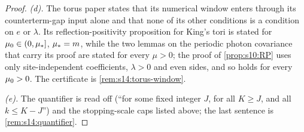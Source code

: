 \begin{proof}
\emph{(d).} The torus paper states that its numerical window enters through its counterterm-gap input alone and that none of its other conditions is a condition on $e$ or $\lambda$. Its reflection-positivity proposition for King's tori is stated for $\mu_0\in(0,\mu_*]$, $\mu_*=m$, while the two lemmas on the periodic photon covariance that carry its proof are stated for every $\mu>0$; the proof of \cref{prop:s10:RP} uses only site-independent coefficients, $\lambda>0$ and even sides, and so holds for every $\mu_0>0$. The certificate is \cref{rem:s14:torus-window}.

\emph{(e).} The quantifier is read off \cite[Thm.~3.1]{K1} (``for some fixed integer $J$, for all $K\ge J$, and all $k\le K-J$'') and the stopping-scale caps listed above; the last sentence is \cref{rem:s14:quantifier}.
\end{proof}

